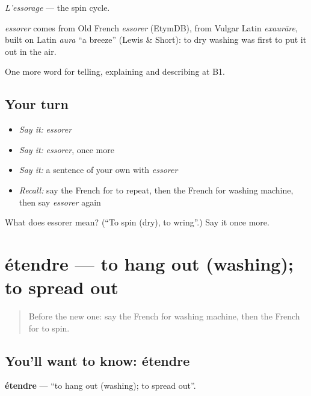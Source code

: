 \emph{L'essorage} — the spin cycle.

\begin{cousinweb}
\emph{essorer} comes from Old French \emph{essorer} (EtymDB), from Vulgar Latin \emph{exaurāre}, built on Latin \emph{aura} \textquotedblleft{}a breeze\textquotedblright{} (Lewis \& Short): to dry washing was first to put it out in the air.
\end{cousinweb}

\begin{grammarlens}[title={What you've built}]
One more word for telling, explaining and describing at B1.
\end{grammarlens}

\subsection*{Your turn}
\begin{itemize}
\raggedright
  \item \emph{Say it:} \emph{essorer}
  \item \emph{Say it:} \emph{essorer}, once more
  \item \emph{Say it:} a sentence of your own with \emph{essorer}
  \item \emph{Recall:} say the French for to repeat, then the French for washing machine, then say \emph{essorer} again
\end{itemize}

\begin{tcolorbox}[breakable,colback=teal!4,colframe=teal!35!black,title={Before you move on}]
What does essorer mean? (\textquotedblleft{}To spin (dry), to wring\textquotedblright{}.) Say it once more.
\end{tcolorbox}
\section[étendre]{étendre — to hang out (washing); to spread out}

\label{lesson:FR-C526-etendre}



\begin{quote}
Before the new one: say the French for washing machine, then the French for to spin.
\end{quote}

\subsection*{You'll want to know: étendre}
\textbf{étendre} — \textquotedblleft{}to hang out (washing); to spread out\textquotedblright{}.

